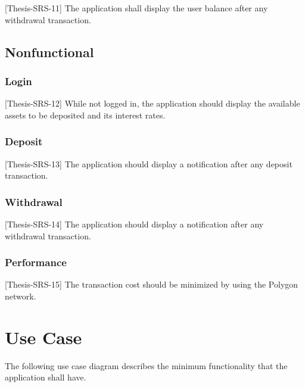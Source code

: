 \documentclass[11pt,a4paper]{report}
\begin{document}
[Thesis-SRS-11] The application shall display the user balance after any withdrawal transaction.

\subsection{Nonfunctional}
\subsubsection{Login}
[Thesis-SRS-12] While not logged in, the application should display the available assets to be deposited and its interest rates. 
\subsubsection{Deposit}
[Thesis-SRS-13] The application should display a notification after any deposit transaction.
\subsubsection{Withdrawal}
[Thesis-SRS-14] The application should display a notification after any withdrawal transaction.
\subsubsection{Performance}
[Thesis-SRS-15] The transaction cost should be minimized by using the Polygon network.

\newpage
\section{Use Case}
The following use case diagram describes the minimum functionality that the application shall have.
\end{document}
